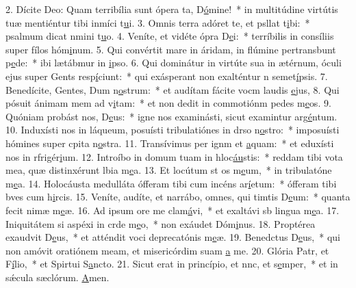 2. Dícite Deo: Quam terribília sunt ópera ta, D\uline{ó}mine!~* in multitúdine virtútis tuæ mentiéntur tibi inmíci t\uline{u}i.
3. Omnis terra adóret te, et psllat t\uline{i}bi:~* psalmum dicat nmini t\uline{u}o.
4. Veníte, et vidéte ópra D\uline{e}i:~* terríbilis in consíliis super fílos hóm\uline{i}num.
5. Qui convértit mare in áridam, in flúmine pertransbunt p\uline{e}de:~* ibi lætábmur in \uline{i}pso.
6. Qui dominátur in virtúte sua in ætérnum, óculi ejus super Gents resp\uline{í}ciunt:~* qui exásperant non exalténtur n semet\uline{í}psis.
7. Benedícite, Gentes, Dum n\uline{o}strum:~* et audítam fácite vocm laudis \uline{e}jus,
8. Qui pósuit ánimam mem ad v\uline{i}tam:~* et non dedit in commotiónm pedes m\uline{e}os.
9. Quóniam probást nos, D\uline{e}us:~* igne nos examinásti, sicut examintur arg\uline{é}ntum.
10. Induxísti nos in láqueum, posuísti tribulatiónes in drso n\uline{o}stro:~* imposuísti hómines super cpita n\uline{o}stra.
11. Transívimus per ignm et \uline{a}quam:~* et eduxísti nos in rfrigér\uline{i}um.
12. Introíbo in domum tuam in hloc\uline{áu}stis:~* reddam tibi vota mea, quæ distinxérunt lbia m\uline{e}a.
13. Et locútum st os m\uline{e}um,~* in tribulatóne m\uline{e}a.
14. Holocáusta medulláta ófferam tibi cum incéns ar\uline{í}etum:~* ófferam tibi bves cum h\uline{i}rcis.
15. Veníte, audíte, et narrábo, omnes, qui timtis D\uline{e}um:~* quanta fecit nimæ m\uline{e}æ.
16. Ad ipsum ore me clam\uline{á}vi,~* et exaltávi sb lingua m\uline{e}a.
17. Iniquitátem si aspéxi in crde m\uline{e}o,~* non exáudet Dóm\uline{i}nus.
18. Proptérea exaudvit D\uline{e}us,~* et atténdit voci deprecatónis m\uline{e}æ.
19. Benedctus D\uline{e}us,~* qui non amóvit oratiónem meam, et misericórdim suam \uline{a} me.
20. Glória Patr, et F\uline{í}lio,~* et Spirtui S\uline{a}ncto.
21. Sicut erat in princípio, et nnc, et s\uline{e}mper,~* et in sǽcula sæclórum. \uline{A}men.
